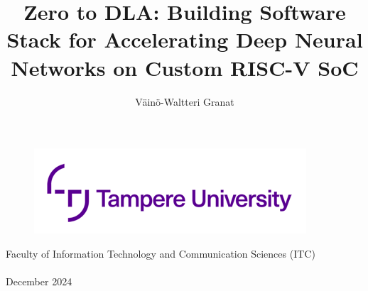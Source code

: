 \documentclass[12pt,a4paper,finnish
]{tunithesis}
\author{Väinö-Waltteri Granat}
\title{Zero to DLA: Building Software Stack for Accelerating Deep Neural Networks on Custom RISC-V SoC} %
\begin{document}
\makeatletter

\thispagestyle{empty}
\vspace*{-.5cm}\noindent

\begin{figure}
    \vspace{-1.3cm}
    \advance\leftskip-2.5cm
    \noindent\includegraphics{../thesis/img/tunilogo.png}
\end{figure}
 
\vspace{2.5cm}
\begin{flushright}
\noindent\textsf{\LARGE{\@author}}

\noindent\vspace{0.5cm}

\noindent\Huge{\textsf{\textbf{\textcolor{tunipurple}{\@title}}}}
\end{flushright}
\vspace{10.7cm} %

\begin{flushright}  
    \begin{spacing}{1.0}
      \textsf{Faculty of Information Technology and Communication Sciences (ITC)\\
      \@thesistype\\
      December 2024}
    \end{spacing}
\end{flushright}

\if@twoside
\clearpage
\fi

%



\end{document}
